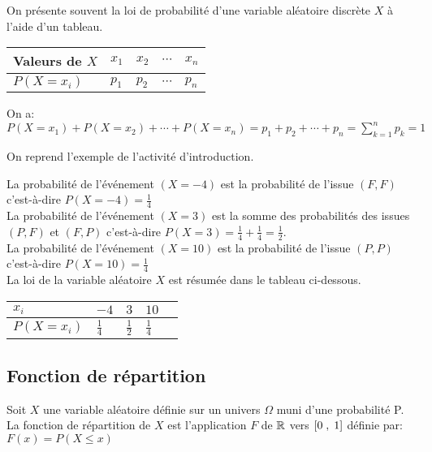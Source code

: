 \begin{remark}
 On présente souvent la loi de probabilité d'une variable aléatoire  discrète $ X $ à l'aide d'un tableau.

\begin{tabularx}{\textwidth}{|X|X|X|X|X|}
\hline
Valeurs de $ X$ &$ x_{1}$& $x_{2}$ &$\cdots$  &$x_{n}$\\
\hline
$ P(X=x_{i}) $ & $ p_{1} $& $ p_{2} $  &$\cdots  $ & $ p_{n} $\\
\hline
\end{tabularx}

On a: $ P(X=x_{1})+P(X=x_{2})+\cdots +P(X=x_{n})= p_{1}+p_{2}+\cdots + p_{n}=\displaystyle\sum_{k=1}^n p_{k}= 1 $
\end{remark}
\begin{example}
On reprend l'exemple de l'activité d'introduction.

 La probabilité de l'événement  $ (X= -4) $  est la probabilité de l'issue $ (F,F) $ c'est-à-dire $ P(X=-4) =\frac{1}{4}$\\
La probabilité de l'événement  $ (X= 3) $  est la somme des  probabilités des issues $ (P,F) $  et  $ (F,P) $ c'est-à-dire $ P(X=3) =\frac{1}{4}+\frac{1}{4}=\frac{1}{2}$.\\
La probabilité de l'événement  $ (X= 10) $  est la probabilité de l'issue $ (P,P) $ c'est-à-dire $ P(X=10) =\frac{1}{4}$\\ La loi de la variable aléatoire $ X $ est résumée dans le tableau ci-dessous.\\

\begin{tabularx}{\textwidth}{|X|X|X|X|X|}
\hline
 $ x_{i}$ & $ -4$ & $ 3$ & $10 $\\
\hline
$ P(X=x_{i}) $ & $ \frac{1}{4} $& $ \frac{1}{2} $   & $ \frac{1}{4} $\\
\hline
\end{tabularx}
\end{example}
\subsection{Fonction de répartition}
\begin{definition}
Soit $ X $  une variable aléatoire définie sur un univers $ \Omega $ muni d'une probabilité P.\\
La fonction de répartition de $ X $  est l'application $ F $ de $ \mathbb{R} $ vers $ \left[0\;,\; 1\right] $ définie par:\;$ F(x)=P (X\leq x) $
\end{definition}

